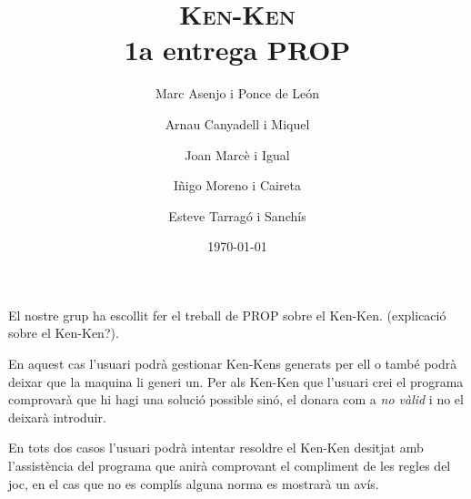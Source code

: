 \documentclass[a4paper,12pt]{article}
\begin{document}
\title{\textsc{Ken-Ken} \\ \large 1a entrega PROP}
\author{Marc Asenjo i Ponce de León \and
	Arnau Canyadell i Miquel \and
	Joan Marcè i Igual \and
	Iñigo Moreno i Caireta \and
	Esteve Tarragó i Sanchís}

\date{\today}
\maketitle

El nostre grup ha escollit fer el treball de PROP sobre el Ken-Ken. (explicació sobre el Ken-Ken?). 

En aquest cas l'usuari podrà gestionar Ken-Kens generats per ell o també podrà deixar que la maquina li generi un. 
Per als Ken-Ken que l'usuari crei el programa comprovarà que hi hagi una solució possible sinó, el donara com a 
\emph{no vàlid} i no el deixarà introduir. 

En tots dos casos l'usuari podrà intentar resoldre el Ken-Ken desitjat amb l'assistència del programa que anirà comprovant
el compliment de les regles del joc, en el cas que no es complís alguna norma es mostrarà un avís.



\end{document}
